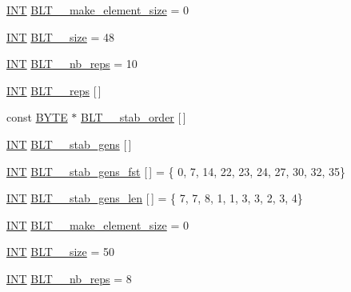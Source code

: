 \begin{DoxyCompactItemize}
\mbox{\hyperlink{galois_8h_a09fddde158a3a20bd2dcadb609de11dc}{I\+NT}} \mbox{\hyperlink{data___b_l_t_8_c_ab4377d26627ba137ff991f1aa2ab536e}{B\+L\+T\+\_\+\_\+make\+\_\+element\+\_\+size}} = 0
\item 
\mbox{\hyperlink{galois_8h_a09fddde158a3a20bd2dcadb609de11dc}{I\+NT}} \mbox{\hyperlink{data___b_l_t_8_c_aa7ab36b57b8e3435a3be3622f7d8d4e8}{B\+L\+T\+\_\+\_\+size}} = 48
\item 
\mbox{\hyperlink{galois_8h_a09fddde158a3a20bd2dcadb609de11dc}{I\+NT}} \mbox{\hyperlink{data___b_l_t_8_c_a56ee431cddc6a7e9bdb7c12511f8752d}{B\+L\+T\+\_\+\_\+nb\+\_\+reps}} = 10
\item 
\mbox{\hyperlink{galois_8h_a09fddde158a3a20bd2dcadb609de11dc}{I\+NT}} \mbox{\hyperlink{data___b_l_t_8_c_a4855d15b9bfdf68df9b0f63f81122e7f}{B\+L\+T\+\_\+\_\+reps}} \mbox{[}$\,$\mbox{]}
\item 
const \mbox{\hyperlink{galois_8h_ab6cc7b4aeb6ea31aba2b3fbfc83ff5e6}{B\+Y\+TE}} $\ast$ \mbox{\hyperlink{data___b_l_t_8_c_a38bd8aa6a8739db607d25991a974ec32}{B\+L\+T\+\_\+\_\+stab\+\_\+order}} \mbox{[}$\,$\mbox{]}
\item 
\mbox{\hyperlink{galois_8h_a09fddde158a3a20bd2dcadb609de11dc}{I\+NT}} \mbox{\hyperlink{data___b_l_t_8_c_ad0a584f9d990dde867937e68410a9b47}{B\+L\+T\+\_\+\_\+stab\+\_\+gens}} \mbox{[}$\,$\mbox{]}
\item 
\mbox{\hyperlink{galois_8h_a09fddde158a3a20bd2dcadb609de11dc}{I\+NT}} \mbox{\hyperlink{data___b_l_t_8_c_a9b90501de86dace7b3e031957fb2c88b}{B\+L\+T\+\_\+\_\+stab\+\_\+gens\+\_\+fst}} \mbox{[}$\,$\mbox{]} = \{ 0, 7, 14, 22, 23, 24, 27, 30, 32, 35\}
\item 
\mbox{\hyperlink{galois_8h_a09fddde158a3a20bd2dcadb609de11dc}{I\+NT}} \mbox{\hyperlink{data___b_l_t_8_c_ac6ca9bc2b70a8cc84880cbb0d400e8ae}{B\+L\+T\+\_\+\_\+stab\+\_\+gens\+\_\+len}} \mbox{[}$\,$\mbox{]} = \{ 7, 7, 8, 1, 1, 3, 3, 2, 3, 4\}
\item 
\mbox{\hyperlink{galois_8h_a09fddde158a3a20bd2dcadb609de11dc}{I\+NT}} \mbox{\hyperlink{data___b_l_t_8_c_afdd26e58b3aedcb33c44256b624ae31e}{B\+L\+T\+\_\+\_\+make\+\_\+element\+\_\+size}} = 0
\item 
\mbox{\hyperlink{galois_8h_a09fddde158a3a20bd2dcadb609de11dc}{I\+NT}} \mbox{\hyperlink{data___b_l_t_8_c_a8c1f858ba9f1d8abc4321bc95ee91bee}{B\+L\+T\+\_\+\_\+size}} = 50
\item 
\mbox{\hyperlink{galois_8h_a09fddde158a3a20bd2dcadb609de11dc}{I\+NT}} \mbox{\hyperlink{data___b_l_t_8_c_a19f0163c6851f6925306e2a99f3eb177}{B\+L\+T\+\_\+\_\+nb\+\_\+reps}} = 8

\end{DoxyCompactItemize}
